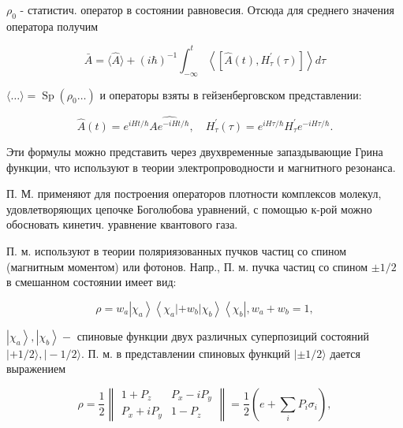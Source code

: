 \documentclass[10pt]{article}
\begin{document}
$\rho_{0}$ - статистич. оператор в состоянии равновесия. Отсюда для среднего значения оператора получим



\[

\bar{A}=\langle\hat{A}\rangle+(i \hbar)^{-1} \int_{-\infty}^{t}\left\langle\left[\hat{A}(t), H_{\tau}^{\prime}(\tau)\right]\right\rangle d \tau

\]



$\langle\ldots\rangle=\operatorname{Sp}\left(\rho_{0} \ldots\right)$ и операторы взяты в гейзенберговском представлении:



\[

\hat{A}(t)=e^{i H t / \hbar} \hat{A e^{-i H t / \hbar}}, \quad H_{\tau}^{\prime}(\tau)=e^{i H \tau / \hbar} H_{\tau}^{\prime} e^{-i H \tau / \hbar} .

\]



Эти формулы можно представить через двухвременные запаздывающие Грина функции, что используют в теории электропроводности и магнитного резонанса.



П. М. применяют для построения операторов плотности комплексов молекул, удовлетворяющих цепочке Боголюбова уравнений, с помощью к-рой можно обосновать кинетич. уравнение квантового газа.



П. м. используют в теории поляриязованных пучков частиц со спином (магнитным моментом) или фотонов. Напр., П. м. пучка частиц со спином $\pm 1 / 2$ в смешанном состоянии имеет вид:



\[

\rho=w_{a}\left|\chi_{a}\right\rangle\left\langle\chi_{a}\left|+w_{b}\right| \chi_{b}\right\rangle\left\langle\chi_{b}\right|, w_{a}+w_{b}=1,

\]



$\left|\chi_{a}\right\rangle,\left|\chi_{b}\right\rangle-$ спиновые функции двух различных суперпозиций состояний $|+1 / 2\rangle,|-1 / 2\rangle$. П. м. в представлении спиновых функций $| \pm 1 / 2\rangle$ дается выражением



\[

\rho=\frac{1}{2}\left\|\begin{array}{ll}

1+P_{z} & P_{x}-i P_{y} \\

P_{x}+i P_{y} & 1-P_{z}

\end{array}\right\|=\frac{1}{2}\left(e+\sum_{i} P_{i} \sigma_{i}\right),

\]
\end{document}
